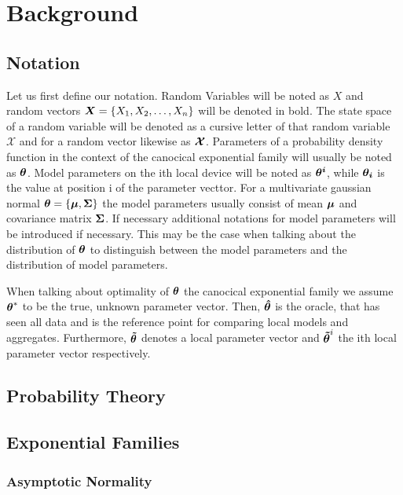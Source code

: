 \chapter{Background}
\label{chapter:kap2}
\section{Notation}
Let us first define our notation. 
Random Variables will be noted as $X$ and random vectors $\boldsymbol{X} = \{X_1, X_2, \ldots, X_n\}$ will be denoted in bold.
The state space of a random variable will be denoted as a cursive letter of that random variable $\mathcal{X}$ and for a random vector likewise as $\boldsymbol{\mathcal{X}}$.
Parameters of a probability density function in the context of the canocical exponential family will usually be noted as $\boldsymbol{\theta}$.
Model parameters on the ith local device will be noted as $\boldsymbol{\theta^i}$, while $\boldsymbol{\theta_i}$ is the value at position i of the parameter vecttor.
For a multivariate gaussian normal $\boldsymbol{\theta} = \{\boldsymbol{\mu}, \boldsymbol{\Sigma}\}$ the model parameters usually consist of mean $\boldsymbol{\mu}$ and covariance matrix $\boldsymbol{\Sigma}$.
If necessary additional notations for model parameters will be introduced if necessary.
This may be the case when talking about the distribution of $\boldsymbol{\theta}$ to distinguish between the model parameters and the distribution of model parameters.

When talking about optimality of $\boldsymbol{\theta}$ \wrt the canocical exponential family we assume $\boldsymbol{\theta}^*$ to be the true, unknown parameter vector.
Then, $\boldsymbol{\hat{\theta}}$ is the oracle, that has seen all data and is the reference point for comparing local models and aggregates.
Furthermore, $\boldsymbol{\tilde{\theta}}$ denotes a local parameter vector and $\boldsymbol{\tilde{\theta}}^i$ the ith local parameter vector respectively.
\section{Probability Theory}
\section{Exponential Families}
\subsection{Asymptotic Normality}
